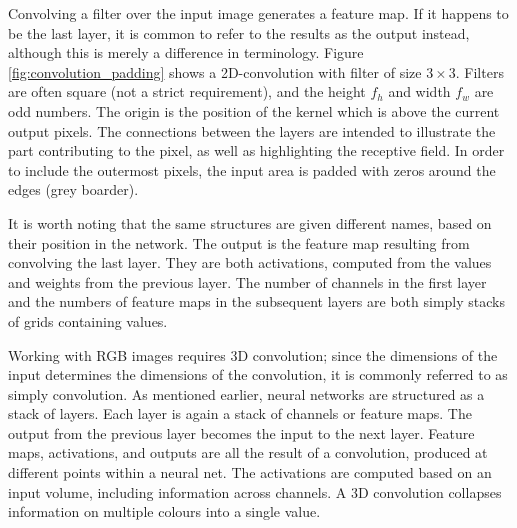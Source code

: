 
Convolving a filter over the input image generates a feature map. If it happens to be the last layer, it is common to refer to the results as the output instead, although this is merely a difference in terminology. Figure \ref{fig:convolution_padding} shows a 2D-convolution with filter of size $3\times 3$. Filters are often square (not a strict requirement), and the height $f_h$ and width $f_w$ are odd numbers. The origin is the position of the kernel which is above the current output pixels. The connections between the layers are intended to illustrate the part contributing to the pixel, as well as highlighting the receptive field. In order to include the outermost pixels, the input area is padded with zeros around the edges (grey boarder). 

It is worth noting that the same structures are given different names, based on their position in the network. The output is the feature map resulting from convolving the last layer. They are both activations, computed from the values and weights from the previous layer. The number of channels in the first layer and the numbers of feature maps in the subsequent layers are both simply stacks of grids containing values.

Working with RGB images requires 3D convolution; since the dimensions of the input determines the dimensions of the convolution, it is commonly referred to as simply convolution. As mentioned earlier, neural networks are structured as a stack of layers. Each layer is again a stack of channels or feature maps. The output from the previous layer becomes the input to the next layer. Feature maps, activations, and outputs are all the result of a convolution, produced at different points within a neural net. The activations are computed based on an input volume, including information across channels. A 3D convolution collapses information on multiple colours into a single value.

